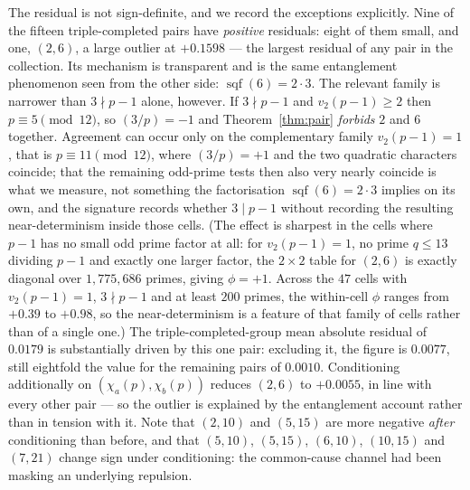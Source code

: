 \documentclass[11pt,reqno]{amsart}
\theoremstyle{plain}
\theoremstyle{definition}
\DeclareMathOperator{\sqf}{sqf}
\begin{document}
The residual is not sign-definite, and we record the exceptions explicitly.
Nine of the fifteen triple-completed pairs have \emph{positive} residuals: eight of
them small, and one, $(2,6)$, a large outlier at $+0.1598$ --- the largest
residual of any pair in the collection. Its mechanism is transparent and is the same
entanglement phenomenon seen from the other side: $\sqf(6) = 2 \cdot 3$. The relevant family is narrower than $3 \nmid p-1$ alone, however. If $3 \nmid p-1$ and $v_2(p-1) \ge 2$ then $p \equiv 5 \pmod{12}$, so $(3/p) = -1$ and Theorem~\ref{thm:pair} \emph{forbids} $2$ and $6$ together. Agreement can occur only on the complementary family $v_2(p-1) = 1$, that is $p \equiv 11 \pmod{12}$, where $(3/p) = +1$ and the two quadratic characters coincide; that the remaining odd-prime tests then also very nearly coincide is what we measure, not something the factorisation $\sqf(6) = 2 \cdot 3$ implies on its own, and the signature records whether $3 \mid p-1$ without recording the
resulting near-determinism inside those cells. (The effect is sharpest in the cells where $p-1$ has no small odd prime factor
at all: for $v_2(p-1) = 1$, no prime $q \le 13$ dividing $p-1$ and exactly one
larger factor, the $2 \times 2$ table for $(2,6)$ is exactly diagonal over
$1{,}775{,}686$ primes, giving $\phi = +1$. Across the $47$ cells with
$v_2(p-1) = 1$, $3 \nmid p-1$ and at least $200$ primes, the within-cell $\phi$
ranges from $+0.39$ to $+0.98$, so the near-determinism is a feature of that family of cells rather
than of a single one.) The triple-completed-group mean absolute residual of $0.0179$ is
substantially driven by this one pair: excluding it, the figure is $0.0077$,
still eightfold the value for the remaining pairs of $0.0010$. Conditioning
additionally on $(\chi_a(p), \chi_b(p))$ reduces $(2,6)$ to $+0.0055$, in line
with every other pair --- so the outlier is explained by the entanglement
account rather than in tension with it.
Note that $(2,10)$ and $(5,15)$ are more negative \emph{after} conditioning
than before, and that $(5,10)$, $(5,15)$, $(6,10)$, $(10,15)$ and $(7,21)$
change sign under conditioning: the common-cause channel had been masking an
underlying repulsion.
\end{document}
